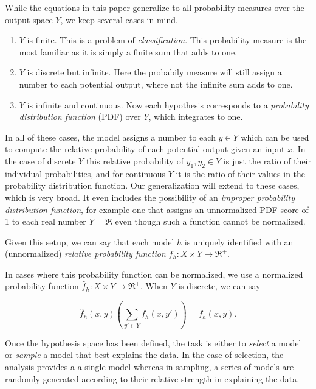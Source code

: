 \documentclass[twoside]{article}
\begin{document}
While the equations in this paper generalize to all probability measures over the output space \(Y\), we keep several cases in mind.
\begin{enumerate}
	\item \(Y\) is finite. This is a problem of \textit{classification}. This probability measure is the most familiar as it is simply a finite sum that adds to one.
	\item \(Y\) is discrete but infinite. Here the probabily measure will still assign a number to each potential output, where not the infinite sum adds to one.
	\item \(Y\) is infinite and continuous. Now each hypothesis corresponds to a \textit{probability distribution function} (PDF) over \(Y\), which integrates to one.
\end{enumerate}

In all of these cases, the model assigns a number to each \(y \in Y\) which can be used to compute the relative probability of each potential output given an input \(x\). In the case of discrete \(Y\) this relative probability of \(y_1, y_2 \in Y\) is just the ratio of their individual probabilities, and for continuous \(Y\) it is the ratio of their values in the probability distribution function. Our generalization will extend to these cases, which is very broad. It even includes the possibility of an \textit{improper probability distribution function}, for example one that assigns an unnormalized PDF score of 1 to each real number \(Y=\Re\) even though such a function cannot be normalized.

Given this setup, we can say that each model \(h\) is uniquely identified with an (unnormalized) \textit{relative probability function} \(f_h: X \times Y \rightarrow \Re^+\).

In cases where this probability function can be normalized, we use a normalized probability function \(\hat{f}_h: X \times Y \rightarrow \Re^+\). When \(Y\) is discrete, we can say

\begin{equation}
\label{eq:normalized_probability_model}
\hat{f}_h(x, y)\left(\sum_{y' \in Y} f_h(x,y')\right)=f_h(x, y).
\end{equation}

Once the hypothesis space has been defined, the task is either to \textit{select} a model or \textit{sample} a model that best explains the data. In the case of selection, the analysis provides a a single model whereas in sampling, a series of models are randomly generated according to their relative strength in explaining the data.
\end{document}
